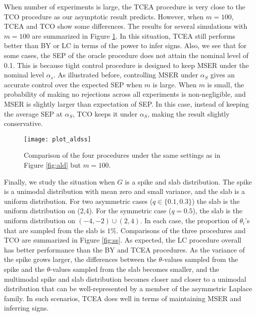 \documentclass[11pt]{article}
\begin{document}
When number of experiments is large, the TCEA procedure is very close to the TCO procedure as our asymptotic result predicts. However, when $m = 100$, TCEA and TCO show some differences. The results for several simulations with $m=100$ are summarized in Figure \ref{fig:aldss}. 
In this situation, %
TCEA still performs better than BY or LC in terms of the power to infer signs. 
Also, we see that for some cases, the SEP of the oracle procedure does not attain the nominal level of 0.1. This is because tight control procedure is designed to keep MSER under the nominal level $\alpha_s$. As illustrated before, controlling MSER under $\alpha_S$ gives an accurate control over the expected SEP when $m$ is large. When $m$ is small,  the probability of making no rejections across all experiments is non-negligible, and MSER is slightly larger than expectation of SEP. In this case, instead of keeping the average SEP at $\alpha_S$, TCO keeps it under $\alpha_S$, making the result slightly conservative. 

\begin{figure}[!h]
	\centering
	\texttt{[image: plot\_aldss]}
	\caption{Comparison of the four procedures under the same settings as in Figure \ref{fig:ald} but $m = 100$. }
	\label{fig:aldss}
\end{figure}

Finally, we study the situation when $G$ is a spike and slab distribution. The spike is a unimodal distribution with mean zero and small variance, and the slab is a uniform distribution.  For two asymmetric cases 
($q\in\{0.1,0.3\}$) 
the slab is the uniform distribution on (2,4). For the symmetric case ($q = 0.5$), the slab is the uniform  distribution on  $(-4, -2) \cup (2, 4)$.  
In each case, 
the proportion of $\theta_i$'s that are sampled from the slab is $1 \%$. Comparisons of the three procedures and TCO  are summarized in Figure \ref{fig:ss}. As expected, the LC procedure overall has better performance than the BY and TCEA procedures. As the variance of the spike grows larger, the differences  between the $\theta$-values sampled from the spike and the $\theta$-values sampled from the slab becomes smaller, and the multimodal spike and slab distribution becomes closer and closer to a unimodal distribution that can be well-represented by a member of the asymmetric Laplace family. In such scenarios, TCEA does well in terms of maintaining MSER and inferring signs.  

\end{document}
